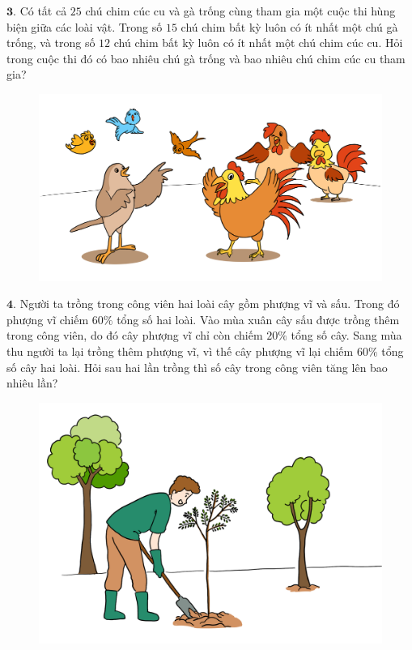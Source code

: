 \begin{multicols}{2}
\begin{figure}[H]
		\vspace*{-15pt}
	\end{figure}
	$\pmb{3.}$ 	Có tất cả $25$ chú chim cúc cu và gà trống cùng tham gia một cuộc thi hùng biện giữa các loài vật. Trong số $15$ chú chim bất kỳ luôn có ít nhất một chú gà trống, và trong số $12$ chú chim bất kỳ luôn có ít nhất một chú chim cúc cu. Hỏi trong cuộc thi đó có bao nhiêu chú gà trống và bao nhiêu chú chim cúc cu tham gia?
	\begin{figure}[H]
		\centering
		\vspace*{-5pt}
		\captionsetup{labelformat= empty, justification=centering}
		\includegraphics[width=1\linewidth]{Pi6_bai3}
		\vspace*{-10pt}
	\end{figure}
	$\pmb{4.}$ Người ta trồng trong công viên hai loài cây gồm phượng vĩ và sấu. Trong đó phượng vĩ chiếm $60\%$ tổng số hai loài. Vào mùa xuân cây sấu được trồng thêm trong công viên, do đó cây phượng vĩ chỉ còn chiếm $20\%$ tổng số cây. Sang mùa thu người ta lại trồng thêm  phượng vĩ, vì thế cây phượng vĩ lại chiếm $60\%$ tổng số cây hai loài. Hỏi sau hai lần trồng thì số cây trong công viên tăng lên bao nhiêu lần?
	\begin{figure}[H]
		\centering
		\vspace*{-5pt}
		\captionsetup{labelformat= empty, justification=centering}
		\includegraphics[width=1\linewidth]{Pi6_bai4}

\end{figure}
\end{multicols}
